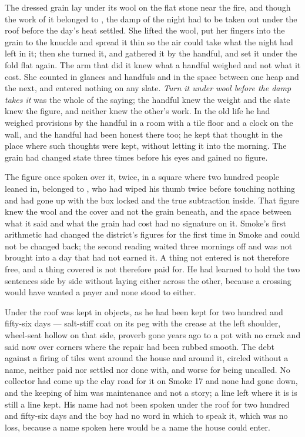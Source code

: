 \scenebreak

The dressed grain lay under its wool on the flat stone near the fire, and though the work of it belonged to , the damp of the night had to be taken out under the roof before the day's heat settled. She lifted the wool, put her fingers into the grain to the knuckle and spread it thin so the air could take what the night had left in it; then she turned it, and gathered it by the handful, and set it under the fold flat again. The arm that did it knew what a handful weighed and not what it cost. She counted in glances and handfuls and in the space between one heap and the next, and entered nothing on any slate. \emph{Turn it under wool before the damp takes it} was the whole of the saying; the handful knew the weight and the slate knew the figure, and neither knew the other's work. In the old life he had weighed provisions by the handful in a room with a tile floor and a clock on the wall, and the handful had been honest there too; he kept that thought in the place where such thoughts were kept, without letting it into the morning. The grain had changed state three times before his eyes and gained no figure.

The figure once spoken over it, twice, in a square where two hundred people leaned in, belonged to , who had wiped his thumb twice before touching nothing and had gone up  with the box locked and the true subtraction inside. That figure knew the wool and the cover and not the grain beneath, and the space between what it said and what the grain had cost had no signature on it. Smoke's first arithmetic had changed the district's figures for the first time in Smoke and could not be changed back; the second reading waited three mornings off and was not brought into a day that had not earned it. A thing not entered is not therefore free, and a thing covered is not therefore paid for. He had learned to hold the two sentences side by side without laying either across the other, because a crossing would have wanted a payer and none stood to either.

Under the roof  was kept in objects, as he had been kept for two hundred and fifty-six days --- salt-stiff coat on its peg with the crease at the left shoulder, wheel-seat hollow on that side, proverb gone years ago to a pot with no crack and said now over corners where the repair had been rubbed smooth. The debt against a firing of tiles went around the house and around it, circled without a name, neither paid nor settled nor done with, and worse for being uncalled. No collector had come up the clay road for it on Smoke 17 and none had gone down, and the keeping of him was maintenance and not a story; a line left where it is is still a line kept. His name had not been spoken under the roof for two hundred and fifty-six days and the boy had no word in which to speak it, which was no loss, because a name spoken here would be a name the house could enter.

